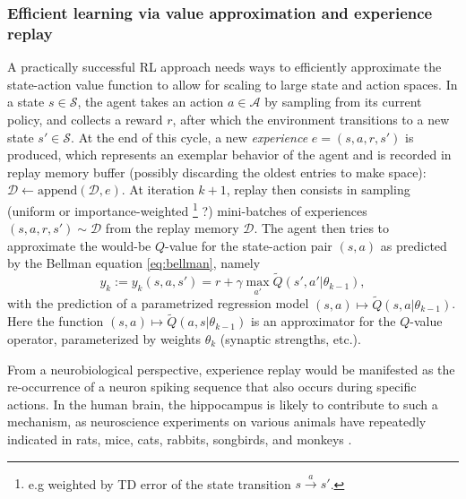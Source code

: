 \documentclass[10pt,letterpaper]{article}
\begin{document}
\subsubsection{Efficient learning via value approximation and experience replay}
A practically successful RL approach
needs ways to efficiently approximate the state-action value function
to allow for scaling to large state and action spaces.
In a state $s \in \mathcal S$, the agent takes an action $a \in \mathcal A$
by sampling from its current policy, and collects a reward $r$,
after which the environment transitions to a new state $s' \in \mathcal S$.
At the end of this cycle, a new \textit{experience} $e = (s,a,r,s')$ is produced, which represents an exemplar
behavior of the agent and is recorded in replay memory buffer
(possibly discarding the oldest entries to make space):
$\mathcal D \leftarrow \text{append}(\mathcal D, e)$.
At iteration $k+1$, replay then consists in sampling (uniform or importance-weighted
\footnote{e.g weighted by TD error of the state transition $s \overset{a}{\rightarrow} s'$.} ?)  mini-batches of experiences
$(s, a, r, s') \sim \mathcal D$ from the replay memory $\mathcal D$.
The agent then tries to approximate
the would-be $Q$-value for the state-action pair $(s,a)$ as predicted by the Bellman equation \eqref{eq:bellman}, namely
\begin{equation}
  y_k := y_k(s,a,s') =  r + \gamma \max_{a'} \tilde{Q}(s', a'|\theta_{k-1}),
\end{equation}
with the prediction of a parametrized regression model $(s,a)
\mapsto \tilde{Q}(s, a|\theta_{k-1})$. Here the function $(s,a) \mapsto \tilde{Q}(a,s|\theta_{k-1})$
is an approximator for the $Q$-value operator,  parameterized by weights $\theta_{k}$
(synaptic strengths, etc.).

From a neurobiological perspective,
experience replay would be manifested as the re-occurrence of a
neuron spiking sequence that also occurs during specific actions.
In the human brain, the hippocampus is likely to contribute to such a mechanism,
as neuroscience experiments on various animals have repeatedly indicated
in rats, mice, cats, rabbits, songbirds, and
monkeys \cite{buhry2011,nokia2010,dave2000,skaggs2007}.
\end{document}

